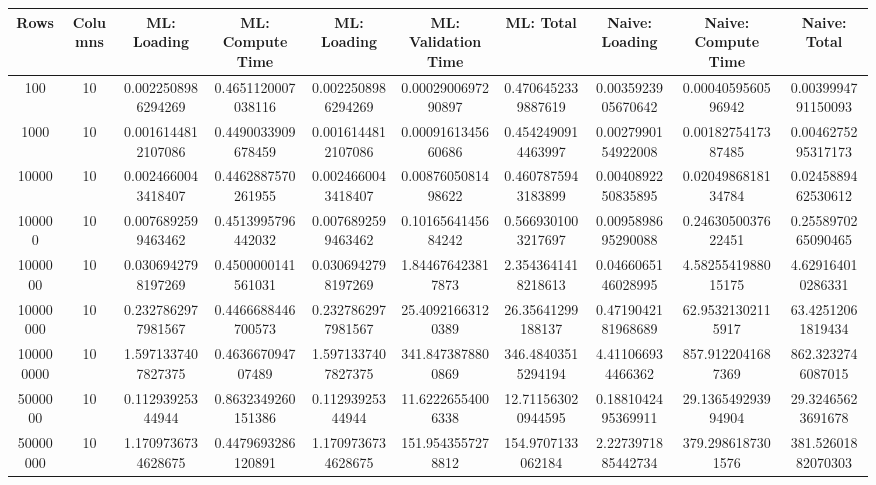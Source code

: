 \begin{table}[htb]
    \centering
    \begin{tabular}{@{}cccccccccc@{}}
        \toprule
        Rows & Columns & ML: Loading & ML: Compute Time & ML: Loading & ML: Validation Time & ML: Total & Naive: Loading & Naive: Compute Time & Naive: Total \\
        \midrule
        100 & 10 & 0.0022508986294269 & 0.4651120007038116 & 0.0022508986294269 & 0.0002900697290897 & 0.4706452339887619 & 0.0035923905670642 & 0.0004059560596942 & 0.0039994791150093 \\
        1000 & 10 & 0.0016144812107086 & 0.4490033909678459 & 0.0016144812107086 & 0.0009161345660686 & 0.4542490914463997 & 0.0027990154922008 & 0.0018275417387485 & 0.0046275295317173 \\
        10000 & 10 & 0.0024660043418407 & 0.4462887570261955 & 0.0024660043418407 & 0.0087605081498622 & 0.4607875943183899 & 0.0040892250835895 & 0.0204986818134784 & 0.0245889462530612 \\
        100000 & 10 & 0.0076892599463462 & 0.4513995796442032 & 0.0076892599463462 & 0.1016564145684242 & 0.5669301003217697 & 0.0095898695290088 & 0.2463050037622451 & 0.2558970265090465 \\
        1000000 & 10 & 0.0306942798197269 & 0.4500000141561031 & 0.0306942798197269 & 1.844676423817873 & 2.3543641418218613 & 0.0466065146028995 & 4.5825541988015175 & 4.629164010286331 \\
        10000000 & 10 & 0.2327862977981567 & 0.4466688446700573 & 0.2327862977981567 & 25.40921663120389 & 26.35641299188137 & 0.4719042181968689 & 62.95321302115917 & 63.42512061819434 \\
        100000000 & 10 & 1.5971337407827375 & 0.463667094707489 & 1.5971337407827375 & 341.8473878800869 & 346.48403515294194 & 4.411066934466362 & 857.9122041687369 & 862.3232746087015 \\
        5000000 & 10 & 0.11293925344944 & 0.8632349260151386 & 0.11293925344944 & 11.62226554006338 & 12.711563020944595 & 0.1881042495369911 & 29.136549293994904 & 29.32465623691678 \\
        50000000 & 10 & 1.1709736734628675 & 0.4479693286120891 & 1.1709736734628675 & 151.9543557278812 & 154.9707133062184 & 2.2273971885442734 & 379.2986187301576 & 381.52601882070303 \\
        \bottomrule
    \end{tabular}
\end{table}